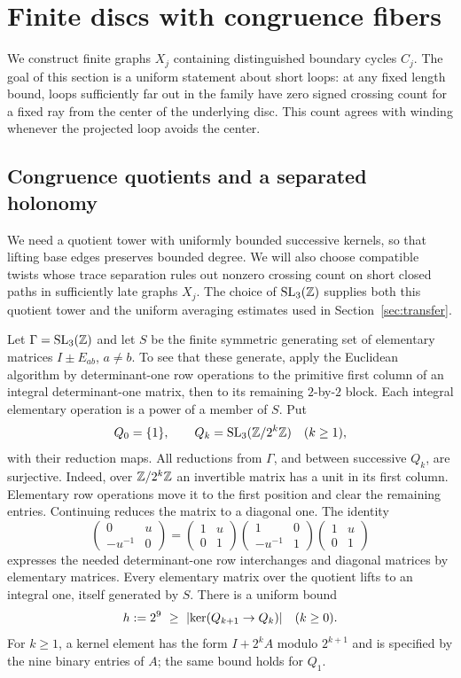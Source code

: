 \section{Finite discs with congruence fibers}\label{sec:geometry}

We construct finite graphs $X_j$ containing distinguished boundary cycles
$C_j$. The goal of this section is a uniform statement about short loops:
at any fixed length bound, loops sufficiently far out in the family have
zero signed crossing count for a fixed ray from the center of the underlying
disc. This count agrees with winding whenever the projected loop avoids
the center.

\subsection{Congruence quotients and a separated holonomy}
We need a quotient tower with uniformly bounded successive kernels, so that
lifting base edges preserves bounded degree. We will also choose compatible
twists whose trace separation rules out nonzero crossing count on short
closed paths in sufficiently late graphs $X_j$. The choice of $\operatorname{SL}_3(\mathbb Z)$ supplies
both this quotient tower and the uniform averaging estimates used in
Section~\ref{sec:transfer}.

Let $\Gamma=\operatorname{SL}_3(\mathbb Z)$ and let $S$ be the finite symmetric generating set of
elementary matrices $I\pm E_{ab}$, $a\ne b$. To see that these generate,
apply the Euclidean algorithm by determinant-one row operations to the
primitive first column of an integral determinant-one matrix, then to its
remaining $2$-by-$2$ block. Each integral elementary operation is a power
of a member of $S$. Put
\[
 Q_0=\{1\},\qquad Q_k=\operatorname{SL}_3(\mathbb Z/2^k\mathbb Z)\quad(k\ge1),
\]
with their reduction maps. All reductions from $\Gamma$, and between
successive $Q_k$, are surjective. Indeed, over $\mathbb Z/2^k\mathbb Z$ an invertible
matrix has a unit in its first column. Elementary row operations move it to
the first position and clear the remaining entries. Continuing reduces the
matrix to a diagonal one. The identity
\[
 \begin{pmatrix}0&u\\-u^{-1}&0\end{pmatrix}
 =\begin{pmatrix}1&u\\0&1\end{pmatrix}
  \begin{pmatrix}1&0\\-u^{-1}&1\end{pmatrix}
  \begin{pmatrix}1&u\\0&1\end{pmatrix}
\]
expresses the needed determinant-one row interchanges and diagonal
matrices by elementary matrices. Every elementary matrix over the quotient
lifts to an integral one, itself generated by $S$.
There is a uniform bound
\begin{equation}\label{eq:kernelbound}
 h:=2^9\ \ge\ \lvert \ker(Q_{k+1}\to Q_k)\rvert\quad(k\ge0).
\end{equation}
For $k\ge1$, a kernel element has the form $I+2^kA$ modulo $2^{k+1}$ and is
specified by the nine binary entries of $A$; the same bound holds for $Q_1$.

